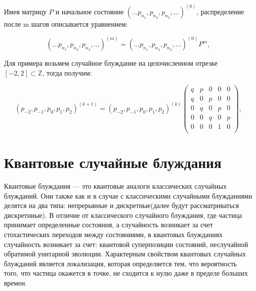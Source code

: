 \documentclass[a4paper]{report}
\begin{document}
Имея матрицу $P$ и начальное состояние $( ... p_{n_{1}}, p_{n_{2}}, p_{n_{3}}, ... )^{(0)}$, распределение после m шагов описывается уравнением:

\begin{equation} \label{eq:2}
    ( ... p_{n_{1}}, p_{n_{2}}, p_{n_{3}}, ... )^{(m)} = ( ... p_{n_{1}}, p_{n_{2}}, p_{n_{3}}, ... )^{(0)} P^{m}
    ,
\end{equation}

Для примера возьмем случайное блуждание на целочисленном отрезке $[-2, 2] \subset \mathbb{Z}$, тогда получим:

\begin{equation} \label{eq:3}
    ( p_{-2}, p_{-1}, p_{0}, p_{1}, p_{2})^{(k+1)} = ( p_{-2}, p_{-1}, p_{0}, p_{1}, p_{2})^{(k)} \left(
                                                                                                    \begin{array}{ccccc}
                                                                                                      q & p & 0 & 0 & 0 \\
                                                                                                      q & 0 & p & 0 & 0 \\
                                                                                                      0 & q & 0 & p & 0 \\
                                                                                                      0 & 0 & q & 0 & p \\
                                                                                                      0 & 0 & 0 & 1 & 0 \\
                                                                                                    \end{array}
                                                                                                  \right)
    ,
\end{equation}


\section{Квантовые случайные блуждания}

Квантовые блуждания — это квантовые аналоги классических случайных блужданий. Они также как и в случае с классическими случайными блужданиями делятся на два типа: непрерывные и дискретные(далее будут рассматриваться дискретниые). В отличие от классического случайного блуждания, где частица принимает  определенные состояния, а случайность возникает за счет стохастических переходов между состояниями, в квантовых блужданиях случайность возникает за счет: квантовой суперпозиции состояний, неслучайной обратимой унитарной эволюции. Характерным свойством квантовых случайных блужданий является локализация, которая определяется тем, что вероятность того, что частица окажется в точке, не сходится к нулю даже в пределе больших времен.
\end{document}

